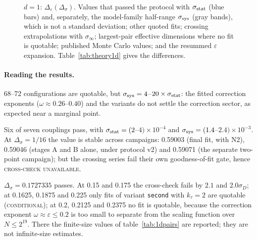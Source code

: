 \documentclass[10pt,a4paper]{article}
\newcommand{\Ds}{\Delta_\sigma}
\newcommand{\De}{\Delta_\varepsilon}
\newcommand{\code}[1]{\texttt{#1}}
\newcommand{\lbl}[1]{{\mdseries\scshape #1}}
\newcommand{\sstat}{\sigma_{\rm stat}}
\newcommand{\ssys}{\sigma_{\rm sys}}
\newcommand{\ktau}{k_\tau}
\begin{document}
\begin{figure}[htbp]
\caption{$d=1$: $\De(\Ds)$. Values that passed the protocol with $\sstat$ (blue bars) and, separately, the model-family half-range $\ssys$
(gray bands), which is not a standard deviation; other quoted fits; crossing extrapolations with $\sigma_\infty$; largest-pair effective
dimensions where no fit is quotable; published Monte Carlo values; and the resummed $\varepsilon$ expansion. Table~\ref{tab:theory1d} gives the
differences.}\label{fig:1d}
\end{figure}

\paragraph{Reading the results.}
\begin{description}[leftmargin=1.2em]
\item[Near $s\to1$ ($\Ds\le0.05$).] 68--72 configurations are quotable, but $\ssys=4$--$20\times\sstat$: the fitted correction exponents
 ($\omega\approx0.26$--$0.40$) and the variants do not settle the correction sector, as expected near a marginal point.
\item[Middle ($0.0625\le\Ds\le0.1375$).] Six of seven couplings pass, with $\sstat=(2$--$4)\times10^{-4}$ and $\ssys=(1.4$--$2.4)\times10^{-3}$. At
 $\Ds=1/16$ the value is stable across campaigns: 0.59003 (final fit, with N2), 0.59046 (stages A and B alone, under protocol v2) and 0.59071
 (the separate two-point campaign); but the crossing series fail their own goodness-of-fit gate, hence \lbl{cross-check unavailable}.
\item[Towards the Gaussian end ($\Ds\ge0.15$).] $\Ds=0.1727335$ passes. At 0.15 and 0.175 the cross-check fails by $2.1$ and $2.0\sigma_D$; at
 0.1625, 0.1875 and 0.225 only fits of variant \code{second} with $\ktau=2$ are quotable (\lbl{conditional}); at 0.2, 0.2125 and 0.2375 no fit is
 quotable, because the correction exponent $\omega\approx\varepsilon\le0.2$ is too small to separate from the scaling function over $N\le2^{19}$.
 There the finite-size values of table~\ref{tab:1dpairs} are reported; they are not infinite-size estimates.
\end{description}
\end{document}
